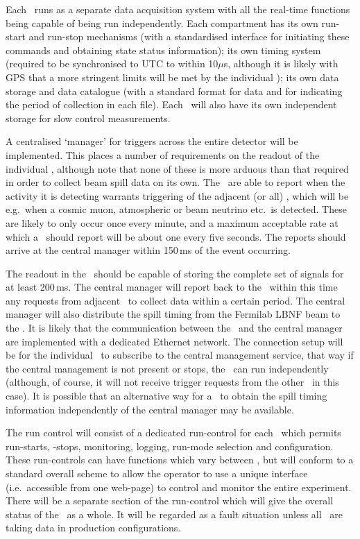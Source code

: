 Each \COMPARTMENT\ runs as a separate data acquisition system with all
the real-time functions being capable of being run independently.
Each compartment has its own run-start and run-stop mechanisms (with a
standardised interface for initiating these commands and obtaining
state status information); its own timing system (required to be
synchronised to UTC to within 10$\mu$s, although it is likely with GPS
that a more stringent limits will be met by the individual
\COMPARTMENTS); its own data storage and data catalogue (with
a standard format for data and for indicating the period of collection
in each file).   Each \COMPARTMENT\ will also have its own independent
storage for slow control measurements.

A centralised `manager' for triggers across the entire detector will
be implemented.  This places a number of requirements on the readout
of the individual \COMPARTMENTS, although note that none of these is
more arduous than that required in order to collect beam spill data on
its own.  The \COMPARTMENTS\ are able to report when the activity it is
detecting warrants triggering of the adjacent (or all) \COMPARTMENTS,
which will be e.g.\ when a cosmic muon, atmospheric or beam neutrino
etc.\ is detected.  These are likely to only occur once every minute,
and a maximum acceptable rate at which a \COMPARTMENT\ should report
will be about one every five seconds.  The reports should arrive at
the central manager within 150\,ms of the event occurring.

The readout in the \COMPARTMENTS\ should be capable of storing the
complete set of signals for at least 200\,ms.  The central manager
will report back to the \COMPARTMENTS\ within this time any requests
from adjacent \COMPARTMENTS\ to collect data within a certain period.
The central manager will also distribute the spill timing from the
Fermilab LBNF beam to the \COMPARTMENTS.  It is likely that the
communication between the \COMPARTMENTS\ and the central manager are
implemented with a dedicated Ethernet network.  The connection setup
will be for the individual \COMPARTMENT\ to subscribe to the central
management service, that way if the central management is not present
or stops, the \COMPARTMENT\ can run independently (although, of course,
it will not receive trigger requests from the other \COMPARTMENTS\ in
this case).  It is possible that an alternative way for a \COMPARTMENT\
to obtain the spill timing information independently of the central
manager may be available.

The run control will consist of a dedicated run-control for each
\COMPARTMENT\ which permits run-starts, -stops, monitoring, logging,
run-mode selection and configuration.  These run-controls can have
functions which vary between \COMPARTMENTS, but will conform to a
standard overall scheme to allow the operator to use a unique
interface (i.e.\ accessible from one web-page) to control and monitor
the entire experiment.  There will be a separate section of the
run-control which will give the overall status of the \COMPARTMENTS\ as
a whole.  It will be regarded as a fault situation unless all
\COMPARTMENTS\ are taking data in production configurations. 

